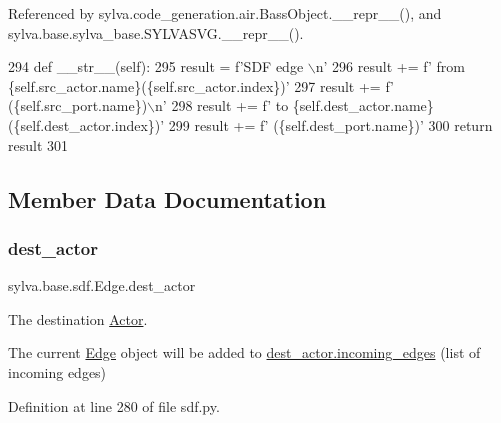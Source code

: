 Referenced by sylva.\+code\+\_\+generation.\+air.\+Bass\+Object.\+\_\+\+\_\+repr\+\_\+\+\_\+(), and sylva.\+base.\+sylva\+\_\+base.\+S\+Y\+L\+V\+A\+S\+V\+G.\+\_\+\+\_\+repr\+\_\+\+\_\+().


\begin{DoxyCode}
294     \textcolor{keyword}{def }\_\_str\_\_(self):
295         result = f\textcolor{stringliteral}{'SDF edge \(\backslash\)n'}
296         result += f\textcolor{stringliteral}{'  from \{self.src\_actor.name\}(\{self.src\_actor.index\})'}
297         result += f\textcolor{stringliteral}{' (\{self.src\_port.name\})\(\backslash\)n'}
298         result += f\textcolor{stringliteral}{'  to \{self.dest\_actor.name\}(\{self.dest\_actor.index\})'}
299         result += f\textcolor{stringliteral}{' (\{self.dest\_port.name\})'}
300         \textcolor{keywordflow}{return} result
301 
\end{DoxyCode}


\subsection{Member Data Documentation}
\mbox{\label{classsylva_1_1base_1_1sdf_1_1_edge_aaf76b434868a8237cd832dbd0a3a20f1}} 
\subsubsection{\texorpdfstring{dest\+\_\+actor}{dest\_actor}}
{\footnotesize\ttfamily sylva.\+base.\+sdf.\+Edge.\+dest\+\_\+actor}



The destination \hyperlink{classsylva_1_1base_1_1sdf_1_1_actor}{Actor}. 

The current \hyperlink{classsylva_1_1base_1_1sdf_1_1_edge}{Edge} object will be added to \hyperlink{classsylva_1_1base_1_1sdf_1_1_actor_a369e42539c2f6dbefafd3ab543428404}{dest\+\_\+actor.incoming\+\_\+edges} (list of incoming edges) 

Definition at line 280 of file sdf.\+py.

\mbox{\label{classsylva_1_1base_1_1sdf_1_1_edge_a9c5834c5e8234311f49654ced9c43424}} 
